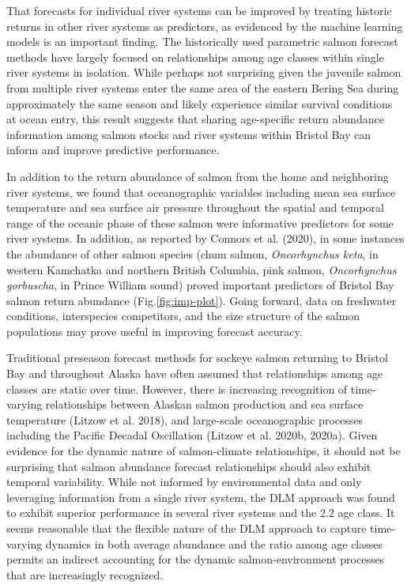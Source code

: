 \documentclass[
]{article}
\begin{document}
That forecasts for individual river systems can be improved by treating historic returns in other river systems as predictors, as evidenced by the machine learning models is an important finding. The historically used parametric salmon forecast methods have largely focused on relationships among age classes within single river systems in isolation. While perhaps not surprising given the juvenile salmon from multiple river systems enter the same area of the eastern Bering Sea during approximately the same season and likely experience similar survival conditions at ocean entry, this result suggests that sharing age-specific return abundance information among salmon stocks and river systems within Bristol Bay can inform and improve predictive performance.

In addition to the return abundance of salmon from the home and neighboring river systems, we found that oceanographic variables including mean sea surface temperature and sea surface air pressure throughout the spatial and temporal range of the oceanic phase of these salmon were informative predictors for some river systems. In addition, as reported by Connors et al. (2020), in some instances the abundance of other salmon species (chum salmon, \emph{Oncorhynchus keta}, in western Kamchatka and northern British Columbia, pink salmon, \emph{Oncorhynchus gorbuscha}, in Prince William sound) proved important predictors of Bristol Bay salmon return abundance (Fig.\ref{fig:imp-plot}). Going forward, data on freshwater conditions, interspecies competitors, and the size structure of the salmon populations may prove useful in improving forecast accuracy.

Traditional preseason forecast methods for sockeye salmon returning to Bristol Bay and throughout Alaska have often assumed that relationships among age classes are static over time. However, there is increasing recognition of time-varying relationships between Alaskan salmon production and sea surface temperature (Litzow et al. 2018), and large-scale oceanographic processes including the Pacific Decadal Oscillation (Litzow et al. 2020b, 2020a). Given evidence for the dynamic nature of salmon-climate relationships, it should not be surprising that salmon abundance forecast relationships should also exhibit temporal variability. While not informed by environmental data and only leveraging information from a single river system, the DLM approach was found to exhibit superior performance in several river systems and the 2.2 age class. It seems reasonable that the flexible nature of the DLM approach to capture time-varying dynamics in both average abundance and the ratio among age classes permits an indirect accounting for the dynamic salmon-environment processes that are increasingly recognized.
\end{document}
